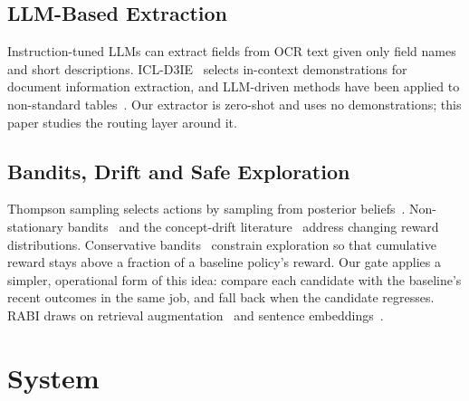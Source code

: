 \documentclass[conference,a4paper]{IEEEtran}
\begin{document}
\subsection{LLM-Based Extraction}
Instruction-tuned LLMs can extract fields from OCR text given only field names and short descriptions. ICL-D3IE~\cite{icld3ie} selects in-context demonstrations for document information extraction, and LLM-driven methods have been applied to non-standard tables~\cite{llmtkie}. Our extractor is zero-shot and uses no demonstrations; this paper studies the routing layer around it.

\subsection{Bandits, Drift and Safe Exploration}
Thompson sampling selects actions by sampling from posterior beliefs~\cite{thompson1933,chapelle2011}. Non-stationary bandits~\cite{besbes2014} and the concept-drift literature~\cite{gama2014} address changing reward distributions. Conservative bandits~\cite{wu2016conservative} constrain exploration so that cumulative reward stays above a fraction of a baseline policy's reward. Our gate applies a simpler, operational form of this idea: compare each candidate with the baseline's recent outcomes in the same job, and fall back when the candidate regresses. RABI draws on retrieval augmentation~\cite{rag} and sentence embeddings~\cite{sbert}.

\section{System}
\label{sec:system}
\end{document}
